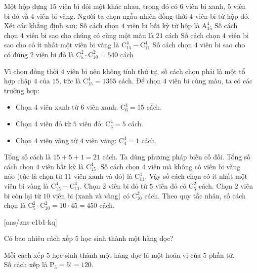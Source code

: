 \begin{ex}%
	Một hộp đựng $15$ viên bi đôi một khác nhau, trong đó có $6$ viên bi xanh, $5$ viên bi đỏ và $4$ viên bi vàng. Người ta chọn ngẫu nhiên đồng thời $4$ viên bi từ hộp đó. Xét các khẳng định sau:
	\choiceTF
	{Số cách chọn $4$ viên bi bất kỳ từ hộp là $\mathrm{A}_{15}^4$}
	{\True Số cách chọn $4$ viên bi sao cho chúng có cùng một màu là $21$ cách}
	{\True Số cách chọn $4$ viên bi sao cho có ít nhất một viên bi vàng là $\mathrm{C}_{15}^4 - \mathrm{C}_{11}^4$}
	{Số cách chọn $4$ viên bi sao cho có đúng $2$ viên bi đỏ là $\mathrm{C}_5^2 \cdot \mathrm{C}_{10}^2 = 540$ cách}
	\loigiai
	{
		\begin{itemchoice}
			\itemch Vì chọn đồng thời $4$ viên bi nên không tính thứ tự, số cách chọn phải là một tổ hợp chập $4$ của $15$, tức là $\mathrm{C}_{15}^4 = 1365$ cách.
			\itemch Để chọn $4$ viên bi cùng màu, ta có các trường hợp:
			\begin{itemize}
				\item Chọn $4$ viên xanh từ $6$ viên xanh: $\mathrm{C}_6^4 = 15$ cách.
				\item Chọn $4$ viên đỏ từ $5$ viên đỏ: $\mathrm{C}_5^4 = 5$ cách.
				\item Chọn $4$ viên vàng từ $4$ viên vàng: $\mathrm{C}_4^4 = 1$ cách.
			\end{itemize}
			Tổng số cách là $15 + 5 + 1 = 21$ cách.
			\itemch Ta dùng phương pháp biến cố đối. Tổng số cách chọn $4$ viên bất kỳ là $\mathrm{C}_{15}^4$. Số cách chọn $4$ viên mà không có viên bi vàng nào (tức là chọn từ $11$ viên xanh và đỏ) là $\mathrm{C}_{11}^4$. Vậy số cách chọn có ít nhất một viên bi vàng là $\mathrm{C}_{15}^4 - \mathrm{C}_{11}^4$.
			\itemch Chọn $2$ viên bi đỏ từ $5$ viên đỏ có $\mathrm{C}_5^2$ cách. Chọn $2$ viên bi còn lại từ $10$ viên bi (xanh và vàng) có $\mathrm{C}_{10}^2$ cách. Theo quy tắc nhân, số cách chọn là $\mathrm{C}_5^2 \cdot \mathrm{C}_{10}^2 = 10 \cdot 45 = 450$ cách.
		\end{itemchoice}
	}
\end{ex}
 
\setcounter{ex}{0}
[ans/ans-c1b1-kq]
\begin{ex}%
	Có bao nhiêu cách xếp $5$ học sinh thành một hàng dọc?
	\par
	\loigiai
	{
		Mỗi cách xếp $5$ học sinh thành một hàng dọc là một hoán vị của $5$ phần tử.
		\\
		Số cách xếp là $\mathrm{P}_5 = 5! = 120$.
	}
\end{ex}
